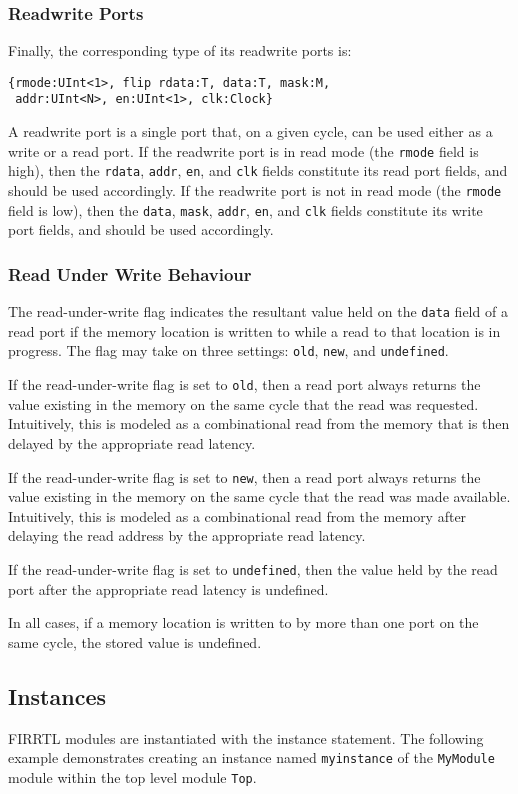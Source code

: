 \documentclass[12pt]{article}
\begin{document}
\subsubsection{Readwrite Ports}
Finally, the corresponding type of its readwrite ports is:
\begin{verbatim}
{rmode:UInt<1>, flip rdata:T, data:T, mask:M, 
 addr:UInt<N>, en:UInt<1>, clk:Clock}
\end{verbatim}
A readwrite port is a single port that, on a given cycle, can be used either as a write or a read port. If the readwrite port is in read mode (the \verb|rmode| field is high), then the \verb|rdata|, \verb|addr|, \verb|en|, and \verb|clk| fields constitute its read port fields, and should be used accordingly. If the readwrite port is not in read mode (the \verb|rmode| field is low), then the \verb|data|, \verb|mask|, \verb|addr|, \verb|en|, and \verb|clk| fields constitute its write port fields, and should be used accordingly. 

\subsubsection{Read Under Write Behaviour}
The read-under-write flag indicates the resultant value held on the \verb|data| field of a read port if the memory location is written to while a read to that location is in progress. The flag may take on three settings: \verb|old|, \verb|new|, and \verb|undefined|.

If the read-under-write flag is set to \verb|old|, then a read port always returns the value existing in the memory on the same cycle that the read was requested. Intuitively, this is modeled as a combinational read from the memory that is then delayed by the appropriate read latency.

If the read-under-write flag is set to \verb|new|, then a read port always returns the value existing in the memory on the same cycle that the read was made available. Intuitively, this is modeled as a combinational read from the memory after delaying the read address by the appropriate read latency.

If the read-under-write flag is set to \verb|undefined|, then the value held by the read port after the appropriate read latency is undefined.

In all cases, if a memory location is written to by more than one port on the same cycle, the stored value is undefined.

\subsection{Instances}
FIRRTL modules are instantiated with the instance statement. The following example demonstrates creating an instance named \verb|myinstance| of the \verb|MyModule| module within the top level module \verb|Top|. 
\end{document}
